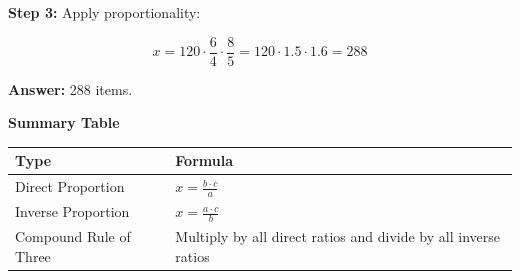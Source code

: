 \textbf{Step 3:} Apply proportionality:

\[
    x = 120 \cdot \frac{6}{4} \cdot \frac{8}{5} = 120 \cdot 1.5 \cdot 1.6 = 288
\]

\textbf{Answer:} 288 items.

\textbf{Summary Table}

\begin{center}
    \begin{tabular}{|l|l|}
    \hline
    \textbf{Type} & \textbf{Formula} \\
    \hline
    Direct Proportion & \(x = \frac{b \cdot c}{a}\) \\
    Inverse Proportion & \(x = \frac{a \cdot c}{b}\) \\
    Compound Rule of Three & Multiply by all direct ratios and divide by all inverse ratios \\
    \hline
    \end{tabular}
\end{center}

